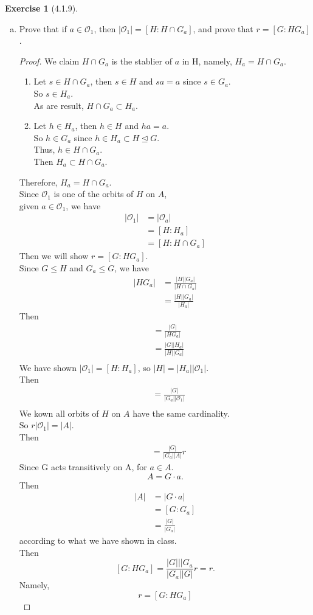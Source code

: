 \documentclass{amsart}
\theoremstyle{plain}
\theoremstyle{definition}
\newtheorem{exer}[lem]{Exercise}
\newcommand{\OO}[1]{\mathcal{O}_{#1}}
\begin{document}
\begin{exer}[4.1.9]
\begin{enumerate}[(a)]
\item
Prove that if $a\in\OO 1$, then $|\OO 1|=[H\colon H\cap G_a]$, and prove that $r=[G\colon HG_a]$. 
\begin{proof}
We claim $H\cap G_a$ is the stablier of $a$ in H, namely, $H_a = H \cap G_a$.\\
\begin{enumerate}
	\item
Let $s \in H \cap G_a$, then $s \in H$ and $sa = a$ since $s \in G_a$.\\
So $s \in H_a$. \\
As are result, $H \cap G_a \subset H_a$.
\item
Let $h \in H_a$, then $h \in H$ and $ha = a$.\\
So $h \in G_a$ since $h \in H_a \subset H \unlhd G$.\\
Thus, $h \in H \cap G_a$.\\
Then $H_a \subset H \cap G_a$.
\end{enumerate}
Therefore, $H_a =H \cap G_a$.\\
Since $\OO{1}$ is one of the orbits of $H$ on $A$,\\
given $a \in \OO 1$, we have 
\begin{align*}
  |\OO 1| &= |\OO a|\\ 
  		 	  	&= [H:H_a] \\
  			 	&=[H:H\cap G_a]
\end{align*}
Then we will show $r=[G:HG_a]$. \\
Since $G\leq H$ and $G_a\leq G$, we have 
\begin{align*}
 	|HG_a| &= \frac{|H||G_a|}{|H\cap G_a|} \\
  		   	 &= \frac{|H||G_a|}{|H_a|} 
\end{align*}
Then 
\begin{align*}
  [G:HG_a] &= \frac{|G|}{|HG_a|} \\
  		   &= \frac{|G||H_a|}{|H||G_a|} \\
\end{align*}
We have shown $|\OO 1|  = [H:H_a]$, so $|H|=|H_a||\OO 1|$.\\
Then
\begin{align*}
  [G:HG_a] &= \frac{|G|}{|G_a||\OO 1|} \\
\end{align*}
We kown all orbits of $H$ on $A$ have the same cardinality. \\
So $r|\OO 1| = |A|$.\\
Then 
\begin{align*}
  [G:HG_a] &= \frac{|G|}{|G_a||A|}r 
\end{align*}
Since G acts transitively on A, for $a \in A$.
\[A = G\cdot a.\]
Then 
\begin{align*}
 	|A| &= |G\cdot a|\\
  		  &= [G:G_a] \\
  		&= \frac{|G|}{|G_a|}
\end{align*}
according to what we have shown in class.\\
Then 
\[ [G:HG_a] = \frac{|G|||G_a}{|G_a||G|}r = r.\]
Namely, 
\[ r = [G:HG_a]\]
\end{proof}
\end{enumerate}
\end{exer}
\end{document}
